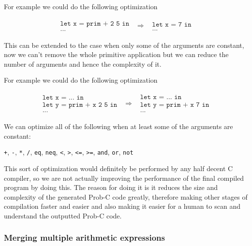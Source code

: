 \documentclass[a4paper]{article}
\newcommand{\optimization}[2]{
	\[
		\begin{array}{rcl}
			#1 & \Rightarrow & #2
		\end{array}
	\]
}
\begin{document}
For example we could do the following optimization
\optimization{
	\begin{array}{l}
		\texttt{let x = prim + 2 5 in} \\
		\texttt{...}
	\end{array}
}{
	\begin{array}{l}
		\texttt{let x = 7 in} \\
		\texttt{...}
	\end{array}
}
This can be extended to the case when only some of the arguments are constant, now we can't remove the whole primitive application but we can reduce the number of arguments and hence the complexity of it.

For example we could do the following optimization
\optimization{
	\begin{array}{l}
		\texttt{let x = ... in} \\
		\texttt{let y = prim + x 2 5 in} \\
		\texttt{...}
	\end{array}
}{
	\begin{array}{l}
		\texttt{let x = ... in} \\
		\texttt{let y = prim + x 7 in} \\
		\texttt{...}
	\end{array}
}
We can optimize all of the following when at least some of the arguments are constant:
\begin{center}
	\texttt{+}, \texttt{-}, \texttt{*}, \texttt{/}, \texttt{eq}, \texttt{neq}, \texttt{<}, \texttt{>}, \texttt{<=}, \texttt{>=}, \texttt{and}, \texttt{or}, \texttt{not}
\end{center}
This sort of optimization would definitely be performed by any half decent C compiler, so we are not actually improving the performance of the final compiled program by doing this. The reason for doing it is it reduces the size and complexity of the generated Prob-C code greatly, therefore making other stages of compilation faster and easier and also making it easier for a human to scan and understand the outputted Prob-C code.




\subsubsection{Merging multiple arithmetic expressions}
\end{document}
